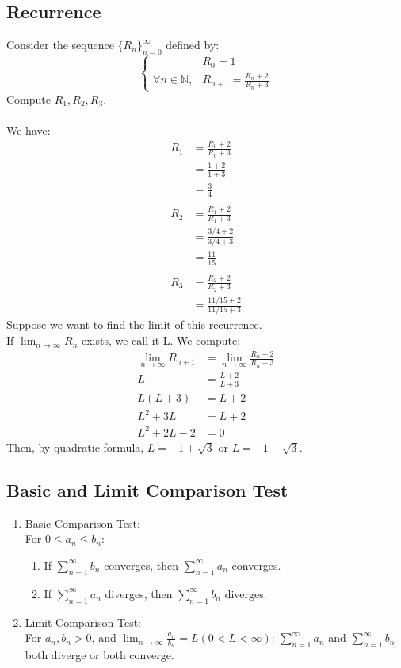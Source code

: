 \documentclass{article}
\begin{document}
\subsection{Recurrence}
Consider the sequence $\{R_n\}_{n=0}^\infty$ defined by:
$$\begin{cases}
& R_0 = 1\\
\forall n \in \mathbb{N}, & R_{n+1} = \frac{R_n + 2}{R_n + 3}
\end{cases}$$
Compute $R_1, R_2, R_3$.\\
\\
We have:
\begin{align*}
    R_1 & = \frac{R_0 + 2}{R_0 + 3}\\
    & = \frac{1+2}{1+3}\\
    & = \frac{3}{4}\\
    \\
    R_2 & = \frac{R_1 + 2}{R_1 + 3}\\
    & = \frac{3/4 + 2}{3/4 + 3}\\
    & = \frac{11}{15}\\
    \\
    R_3 & = \frac{R_2 + 2}{R_2 +3}\\
    & = \frac{11/15 + 2}{11/15 + 3}
\end{align*}
Suppose we want to find the limit of this recurrence.\\
If $\lim_{n\to\infty} R_n$ exists, we call it L. We compute:
\begin{align*}
    \lim_{n\to\infty} R_{n+1} & = \lim_{n\to\infty} \frac{R_n + 2}{R_n + 3}\\
    L & = \frac{L+2}{L+3}\\
    L(L+3) & = L + 2\\
    L^2 + 3L & = L + 2\\
    L^2 + 2L - 2 & = 0
\end{align*}
Then, by quadratic formula, $L = -1 + \sqrt{3}$ or $L = -1 - \sqrt{3}$.
\subsection{Basic and Limit Comparison Test}
\begin{enumerate}
    \item Basic Comparison Test:\\
    For $0 \leq a_n \leq b_n$:
    \begin{enumerate}
        \item If $\sum_{n=1}^\infty b_n$ converges, then $\sum_{n=1}^\infty a_n$ converges.
        \item If $\sum_{n=1}^\infty a_n$ diverges, then $\sum_{n=1}^\infty b_n$ diverges.
    \end{enumerate}
    
    \item Limit Comparison Test:\\
    For $a_n, b_n > 0$, and $\lim_{n\to\infty} \frac{a_n}{b_n} = L (0 < L < \infty)$:
    $\sum_{n=1}^\infty a_n$ and $\sum_{n=1}^\infty b_n$ both diverge or both converge.
\end{enumerate}
\end{document}
